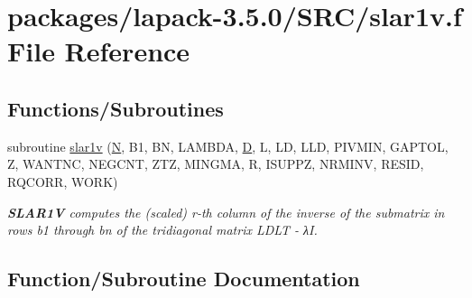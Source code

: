\hypertarget{slar1v_8f}{}\section{packages/lapack-\/3.5.0/\+S\+R\+C/slar1v.f File Reference}
\label{slar1v_8f}
\subsection*{Functions/\+Subroutines}
\begin{DoxyCompactItemize}
\item 
subroutine \hyperlink{slar1v_8f_a39db5d580ea21e47dc9a5defd797793e}{slar1v} (\hyperlink{polmisc_8c_a0240ac851181b84ac374872dc5434ee4}{N}, B1, B\+N, L\+A\+M\+B\+D\+A, \hyperlink{odrpack_8h_a7dae6ea403d00f3687f24a874e67d139}{D}, L, L\+D, L\+L\+D, P\+I\+V\+M\+I\+N, G\+A\+P\+T\+O\+L, Z, W\+A\+N\+T\+N\+C, N\+E\+G\+C\+N\+T, Z\+T\+Z, M\+I\+N\+G\+M\+A, R, I\+S\+U\+P\+P\+Z, N\+R\+M\+I\+N\+V, R\+E\+S\+I\+D, R\+Q\+C\+O\+R\+R, W\+O\+R\+K)
\begin{DoxyCompactList}\small\item\em {\bfseries S\+L\+A\+R1\+V} computes the (scaled) r-\/th column of the inverse of the submatrix in rows b1 through bn of the tridiagonal matrix L\+D\+L\+T -\/ λ\+I. \end{DoxyCompactList}\end{DoxyCompactItemize}


\subsection{Function/\+Subroutine Documentation}
\hypertarget{slar1v_8f_a39db5d580ea21e47dc9a5defd797793e}{}
